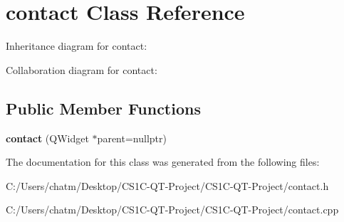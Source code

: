 \hypertarget{classcontact}{}\section{contact Class Reference}
\label{classcontact}


Inheritance diagram for contact\+:


Collaboration diagram for contact\+:
\subsection*{Public Member Functions}
\begin{DoxyCompactItemize}
\item 
\mbox{\label{classcontact_a2eb1f3888e99da578ddd76c059bcbe7e}} 
{\bfseries contact} (Q\+Widget $\ast$parent=nullptr)
\end{DoxyCompactItemize}


The documentation for this class was generated from the following files\+:\begin{DoxyCompactItemize}
\item 
C\+:/\+Users/chatm/\+Desktop/\+C\+S1\+C-\/\+Q\+T-\/\+Project/\+C\+S1\+C-\/\+Q\+T-\/\+Project/contact.\+h\item 
C\+:/\+Users/chatm/\+Desktop/\+C\+S1\+C-\/\+Q\+T-\/\+Project/\+C\+S1\+C-\/\+Q\+T-\/\+Project/contact.\+cpp\end{DoxyCompactItemize}
